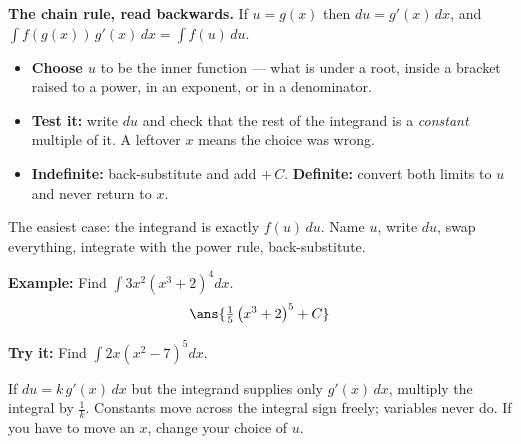 \documentclass[12pt]{article}
\begin{document}

\begin{formulabox}
\textbf{The chain rule, read backwards.} If $u = g(x)$ then $du = g'(x)\,dx$, and
$\int f(g(x))\,g'(x)\,dx = \int f(u)\,du$.
\begin{itemize}[leftmargin=0.9cm, itemsep=1pt, topsep=1pt]
\item \textbf{Choose $u$} to be the inner function --- what is under a root,
inside a bracket raised to a power, in an exponent, or in a denominator.
\item \textbf{Test it:} write $du$ and check that the rest of the integrand is a
\emph{constant} multiple of it. A leftover $x$ means the choice was wrong.
\item \textbf{Indefinite:} back-substitute and add $+\,C$.
\textbf{Definite:} convert both limits to $u$ and never return to $x$.
\end{itemize}
\end{formulabox}


\begin{formulabox}
The easiest case: the integrand is exactly $f(u)\,du$. Name $u$, write $du$, swap
everything, integrate with the power rule, back-substitute.
\end{formulabox}

\begin{examplebox}
\textbf{Example:} Find $\displaystyle\int 3x^2\left(x^3+2\right)^4 dx$.
\[ \ans{\tfrac{1}{5}\left(x^3+2\right)^5 + C} \]
\end{examplebox}

\begin{tryitbox}
\textbf{Try it:} Find $\displaystyle\int 2x\left(x^2-7\right)^5 dx$.\\[2pt]
\end{tryitbox}


\begin{formulabox}
If $du = k\,g'(x)\,dx$ but the integrand supplies only $g'(x)\,dx$, multiply the
integral by $\frac{1}{k}$. Constants move across the integral sign freely;
variables never do. If you have to move an $x$, change your choice of $u$.
\end{formulabox}
\end{document}
